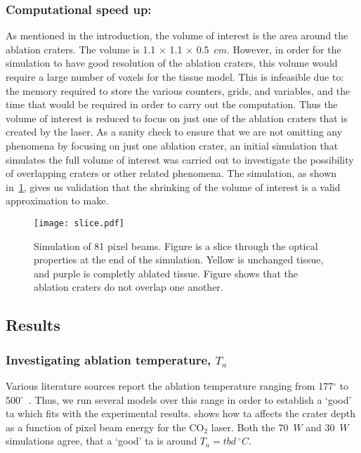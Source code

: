 \subsubsection{Computational speed up:}
As mentioned in the introduction, the volume of interest is the area around the ablation craters. The volume is 1.1 $\times$ 1.1 $\times$ 0.5~$cm$. However, in order for the simulation to have good resolution of the ablation craters, this volume would require a large number of voxels for the tissue model. This is infeasible due to: the memory required to store the various counters, grids, and variables, and the time that would be required in order to carry out the computation. Thus the volume of interest is reduced to focus on just one of the ablation craters that is created by the laser.
As a sanity check to ensure that we are not omitting any phenomena by focusing on just one ablation crater, an initial simulation that simulates the full volume of interest was carried out to investigate the possibility of overlapping craters or other related phenomena. The simulation, as shown in~\cref{fig:sizecheck}, gives us validation that the shrinking of the volume of interest is a valid approximation to make.

\begin{figure}
	\centering
    \texttt{[image: slice.pdf]}
    \caption{Simulation of 81 pixel beams. Figure is a slice through the optical properties at the end of the simulation. Yellow is unchanged tissue, and purple is completly ablated tissue. Figure shows that the ablation craters do not overlap one another.}\label{fig:sizecheck}
\end{figure}

\subsection{Results}

\subsubsection{Investigating ablation temperature, \texorpdfstring{$T_a$}{Ta}}

Various literature sources report the ablation temperature ranging from 177$^{\circ}$ to 500$^{\circ}$~\cite{gerstmann1994char,mckenzie1986three,sagi1992heating}. Thus, we run several models over this range in order to establish a `good' \gls{ta} which fits with the experimental results.  shows how \gls{ta} affects the crater depth as a function of pixel beam energy for the CO$_2$ laser. Both the 70~$W$ and 30~$W$ simulations agree, that a `good' \gls{ta} is around $T_a=tbd~^{\circ}C$.

